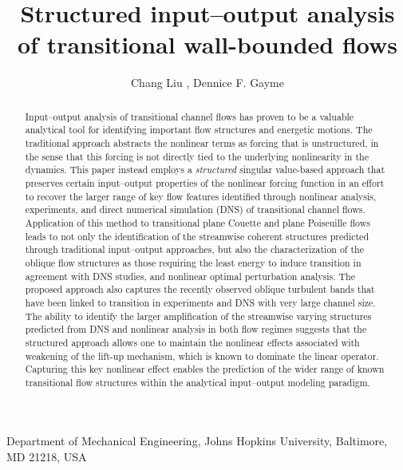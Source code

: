\documentclass{jfm}
\newcommand{\rev}[1]{{\color{black}#1}}
\begin{document}

\title{Structured input--output analysis of transitional wall-bounded flows}

\author
 {
 Chang Liu
  , Dennice F. Gayme 
  }

\affiliation
{
Department of Mechanical Engineering, Johns Hopkins University, Baltimore, MD 21218, USA

}

\maketitle

\begin{abstract}

Input--output analysis of transitional channel flows has proven to be a valuable analytical tool for identifying important flow structures and energetic motions. The traditional approach abstracts the nonlinear terms as forcing that is unstructured, in the sense that \rev{this forcing} is not directly tied to the underlying nonlinearity in the dynamics. This paper instead employs a \emph{structured} singular value-based approach that preserves certain input--output properties of the nonlinear forcing function in an effort to recover the larger range of key flow features identified through nonlinear analysis, experiments, and direct numerical simulation (DNS) of transitional channel flows. Application of this method to transitional plane Couette and plane Poiseuille flows leads to \rev{not only the identification of} the streamwise coherent structures predicted through traditional input--output approaches,  \rev{ but also the} characterization of the oblique flow structures as those requiring the least energy to induce transition in agreement with DNS studies, and nonlinear optimal perturbation analysis. The proposed approach also captures the recently observed oblique turbulent bands that have been linked to transition in experiments and DNS with very large channel size. The ability to identify the larger amplification of the streamwise varying structures predicted from DNS and nonlinear analysis in both flow regimes suggests that the structured approach allows one to maintain the nonlinear effects associated with  \rev{weakening} of the lift-up mechanism, which is known to dominate the linear operator. Capturing this key nonlinear \rev{effect} enables the prediction of the wider range of known transitional flow structures within the analytical input--output modeling paradigm.




\end{abstract}
\end{document}
